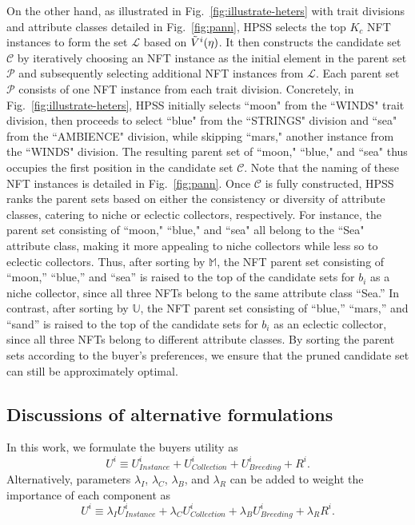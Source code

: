 \documentclass[conference]{IEEEtran}
\newcommand{\1}[1]{\mathds{1}\left[#1\right]}
\theoremstyle{plain}
\newcommand*{\defeq}{\equiv}
\newcommand{\heters}{HPSS\xspace}
\newcommand{\heterb}{Heterogeneous Breeding\xspace}
\begin{document}
{    On the other hand, as illustrated in Fig.~\ref{fig:illustrate-heters} with trait divisions and attribute classes detailed in Fig.~\ref{fig:pann}, \heters selects the top $K_c $ NFT instances to form the set $\mathcal{L}$ based on $\Tilde{V}^i(\eta)$. It then constructs the candidate set $\mathcal{C}$ by iteratively choosing an NFT instance as the initial element in the parent set $\mathcal{P}$ and subsequently selecting additional NFT instances from $\mathcal{L}$. Each parent set $\mathcal{P}$ consists of one NFT instance from each trait division. Concretely, in Fig.~\ref{fig:illustrate-heters}, \heters initially selects ``moon" from the ``WINDS" trait division, then proceeds to select ``blue" from the ``STRINGS" division and ``sea" from the ``AMBIENCE" division, while skipping ``mars," another instance from the ``WINDS" division. The resulting parent set of ``moon," ``blue," and ``sea" thus occupies the first position in the candidate set $\mathcal{C}$. Note that the naming of these NFT instances is detailed in Fig.~\ref{fig:pann}. Once $\mathcal{C}$ is fully constructed, \heters ranks the parent sets based on either the consistency or diversity of attribute classes, catering to niche or eclectic collectors, respectively. For instance, the parent set consisting of ``moon," ``blue," and ``sea" all belong to the ``Sea" attribute class, making it more appealing to niche collectors while less so to eclectic collectors. Thus, after sorting by $\mathbb{M}$, the NFT parent set consisting of ``moon,'' ``blue,'' and ``sea'' is raised to the top of the candidate sets for $b_i$ as a niche collector, since all three NFTs belong to the same attribute class ``Sea.'' In contrast, after sorting by $\mathbb{U}$, the NFT parent set consisting of ``blue,'' ``mars,'' and ``sand'' is raised to the top of the candidate sets for $b_i$ as an eclectic collector, since all three NFTs belong to different attribute classes. By sorting the parent sets according to the buyer's preferences, we ensure that the pruned candidate set can still be approximately optimal.
    
    


\subsection{Discussions of alternative formulations}
\label{appsub:alternative}
In this work, we formulate the buyers utility as 
\begin{equation}
    U^i \defeq U^i_\textit{Instance} + U^i_\textit{Collection} + U^i_\textit{Breeding} + R^i.
\end{equation}
Alternatively, parameters $\lambda_{I}$, $\lambda_{C}$, $\lambda_{B}$, and $\lambda_{R}$ can be added to weight the importance of each component as
\begin{equation}
    U^i \defeq \lambda_{I}U^i_\textit{Instance} + \lambda_{C}U^i_\textit{Collection} + \lambda_{B}U^i_\textit{Breeding} + \lambda_{R}R^i.
\end{equation}

}
\end{document}
